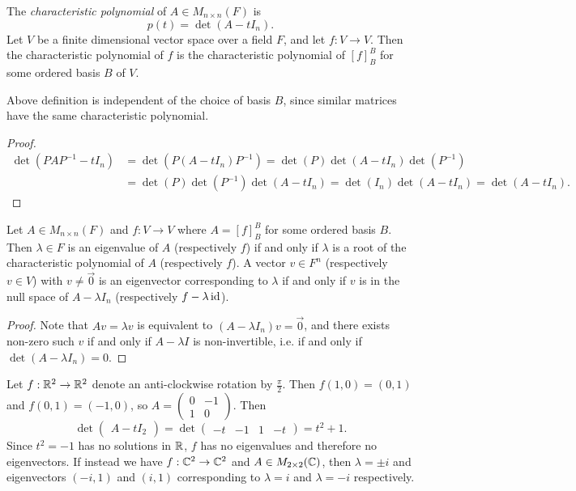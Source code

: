 \begin{defn}
    The \emph{characteristic polynomial} of $A \in M_{n \times n}(F)$ is
    \[p(t) = \det(A - tI_n).\]
    Let $V$ be a finite dimensional vector space over a field $F$, and let $f: V \to V$. Then the characteristic polynomial of $f$ is the characteristic polynomial of $[f]_B^B$ for some ordered basis $B$ of $V$.
\end{defn}

\begin{prop}
    Above definition is independent of the choice of basis $B$, since similar matrices have the same characteristic polynomial.
\end{prop}

\begin{proof}
    \begin{align*}
        \det(PAP^{-1}-tI_n) &= \det(P(A-tI_n)P^{-1}) = \det(P)\det(A-tI_n)\det(P^{-1}) \\
        &= \det(P)\det(P^{-1})\det(A-tI_n) = \det(I_n)\det(A-tI_n) = \det(A-tI_n).
    \end{align*}
\end{proof}

\begin{prop}
    Let $A \in M_{n \times n}(F)$ and $f: V \to V$ where $A = [f]_B^B$ for some ordered basis $B$. Then $\lambda \in F$ is an eigenvalue of $A$ (respectively $f$) if and only if $\lambda$ is a root of the characteristic polynomial of $A$ (respectively $f$). A vector $v \in F^n$ (respectively $v \in V$) with $v \neq \vec{0}$ is an eigenvector corresponding to $\lambda$ if and only if $v$ is in the null space of $A - \lambda I_n$ (respectively $f - \lambda \operatorname{id}$).
\end{prop}

\begin{proof}
    Note that $Av = \lambda v$ is equivalent to $(A - \lambda I_n)v = \vec{0}$, and there exists non-zero such $v$ if and only if $A - \lambda I$ is non-invertible, i.e. if and only if $\det(A - \lambda I_n) = 0$.
\end{proof}

\begin{exmp}
    Let $f: \mathbb{R}^2 \to \mathbb{R}^2$ denote an anti-clockwise rotation by $\frac{\pi}{2}$. Then $f(1, 0) = (0, 1)$ and $f(0, 1) = (-1, 0)$, so $A = \begin{pmatrix}0 & -1 \\ 1 & 0\end{pmatrix}$. Then
    \[\det\begin{pmatrix}A - tI_2\end{pmatrix} = \det\begin{pmatrix}-t & -1 & 1 & -t\end{pmatrix} = t^2 + 1.\] Since $t^2 = -1$ has no solutions in $\mathbb{R}$, $f$ has no eigenvalues and therefore no eigenvectors. If instead we have $f: \mathbb{C}^2 \to \mathbb{C}^2$ and $A \in M_{2 \times 2}(\mathbb{C})$, then $\lambda = \pm i$ and eigenvectors $(-i, 1)$ and $(i, 1)$ corresponding to $\lambda = i$ and $\lambda = -i$ respectively.
\end{exmp}

